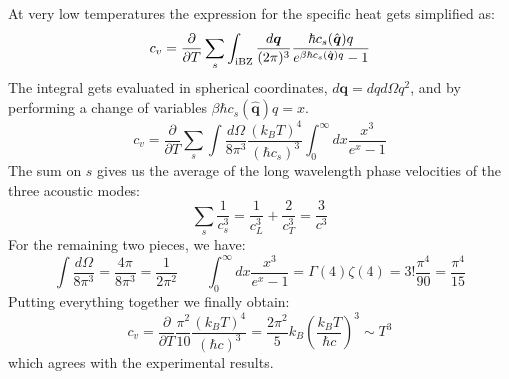 \documentclass[10.75pt,a4paper,openright,bottom=2cm]{article}
\renewcommand{\Vec}[1]{\boldsymbol{#1}}
\newcommand{\RN}[1]{%
  \textup{\uppercase\expandafter{\romannumeral#1}}%
}
\begin{document}
At very low temperatures the expression for the specific heat gets simplified as:
\[
c_v=\frac{\partial}{\partial T}\sum_s\int_{\text{\RN{1}BZ}}\frac{d\Vec{q}}{(2\pi)^3}\frac{\hbar c_s(\hat{\Vec{q}})q}{e^{\beta\hbar c_s(\hat{\Vec{q}})q}-1}
\]
The integral gets evaluated in spherical coordinates, $d\Vec{q}=dqd\Omega q^2$, and by performing a change of variables $\beta\hbar c_s(\hat{\Vec{q}})q=x$.
\[
c_v=\frac{\partial}{\partial T}\sum_s\int\frac{d\Omega}{8\pi^3}\frac{(k_BT)^4}{(\hbar c_s)^3}\int_0^\infty dx\frac{x^3}{e^x-1}
\]
The sum on $s$ gives us the average of the long wavelength phase velocities of the three acoustic modes:
\[
\sum_s\frac{1}{c_s^3}=\frac{1}{c_L^3}+\frac{2}{c_T^3}=\frac{3}{c^3}
\]
For the remaining two pieces, we have:
\[
\int\frac{d\Omega}{8\pi^3}=\frac{4\pi}{8\pi^3}=\frac{1}{2\pi^2} \qquad \int_0^\infty dx\frac{x^3}{e^x-1}=\Gamma(4)\zeta(4)=3!\frac{\pi^4}{90}=\frac{\pi^4}{15}
\]
Putting everything together we finally obtain:
\[
c_v=\frac{\partial}{\partial T}\frac{\pi^2}{10}\frac{(k_BT)^4}{(\hbar c)^3}=\frac{2\pi^2}{5}k_B\left(\frac{k_BT}{\hbar c}\right)^3\sim T^3
\]
which agrees with the experimental results.
\end{document}
